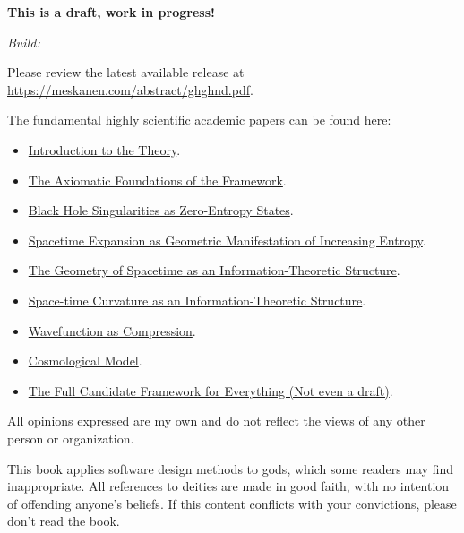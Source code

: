 \newpage
\thispagestyle{empty} %
\vspace*{\fill}       %

\begin{flushleft}
    \small
    
    \textbf{This is a draft, work in progress!}

    \textit{Build: \DTMnow}

    Please review the latest available release at \href{https://meskanen.com/abstract/ghd.pdf}{https://meskanen.com/abstract/ghghnd.pdf}.

    The fundamental highly scientific academic papers can be found here:
    
    \begin{itemize}
    \item \href{https://meskanen.com/abstract/introduction.pdf}{Introduction to the Theory}.
    \item \href{https://meskanen.com/abstract/informational-derivation-of-reality.pdf}{The Axiomatic Foundations of the \iame{} Framework}.
    \item \href{https://meskanen.com/abstract/black-hole-singularities.pdf}{Black Hole Singularities as Zero-Entropy States}.
    \item \href{https://meskanen.com/abstract/emergence-of-spacetime.pdf}{Spacetime Expansion as Geometric Manifestation of Increasing Entropy}.
    \item \href{https://meskanen.com/abstract/geometry-of-spacetime.pdf}{The Geometry of Spacetime as an Information-Theoretic Structure}.
    \item \href{https://meskanen.com/abstract/emergence-of-gr.pdf}{Space-time Curvature as an Information-Theoretic Structure}.
    \item \href{https://meskanen.com/abstract/wavefunction-as-compression.pdf}{Wavefunction as Compression}.
    \item \href{https://meskanen.com/abstract/cosmological-model.pdf}{Cosmological Model}.
    \item \href{https://meskanen.com/abstract/real-theory-of-everything.pdf}{The Full Candidate Framework for Everything (Not even a draft)}.
    \end{itemize}
    
    All opinions expressed are my own and do not reflect the views of any other person or organization. 

    This book applies software design methods to gods, which some readers may find inappropriate.
    All references to deities are made in good faith, with no intention of offending anyone’s beliefs.
    If this content conflicts with your convictions, please don't read the book.


\end{flushleft}
